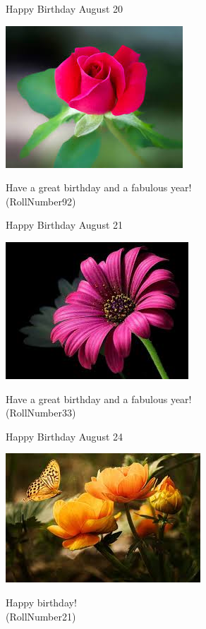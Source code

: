 \documentclass[table, landscape]{beamer}
\begin{document}
\begin{frame}{\color{red}Happy Birthday }
{August 20}
\begin{center}
\includegraphics[height=0.5\textheight]{flowers/f3.jpeg}

Have a great birthday and a fabulous year! \\ \vspace{0.5cm}{\Large name85} (RollNumber92)
\end{center}
\end{frame}
\begin{frame}{\color{blue}Happy Birthday }
{August 21}
\begin{center}
\includegraphics[height=0.5\textheight]{flowers/f2.jpeg}

Have a great birthday and a fabulous year! \\ \vspace{0.5cm}{\Large name28} (RollNumber33)
\end{center}
\end{frame}
\begin{frame}{\color{red}Happy Birthday }
{August 24}
\begin{center}
\includegraphics[height=0.5\textheight]{flowers/f7.jpeg}

Happy birthday! \\ \vspace{0.5cm}{\Large name16} (RollNumber21)
\end{center}
\end{frame}
\end{document}
